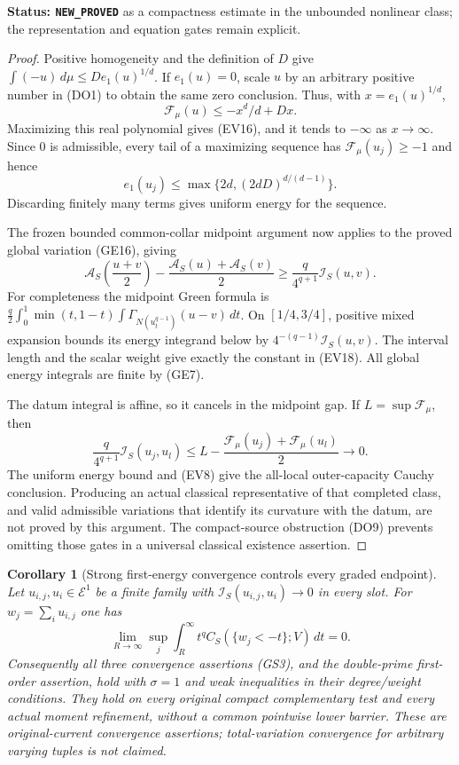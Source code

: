 \documentclass[11pt,a4paper]{article}
\numberwithin{equation}{section}
\newtheorem{corollary}[theorem]{Corollary}
\theoremstyle{definition}
\theoremstyle{remark}
\begin{document}
\noindent\textbf{Status: \texttt{NEW\_PROVED}} as a
compactness estimate in the unbounded nonlinear class;
the representation and equation gates remain explicit.

\begin{proof}
Positive homogeneity and the definition of $D$ give
$\int(-u)\,d\mu\leq D e_1(u)^{1/d}$.
If $e_1(u)=0$, scale $u$ by an arbitrary positive number
in (DO1) to obtain the same zero conclusion.
Thus, with $x=e_1(u)^{1/d}$,
\[
                \mathcal F_\mu(u)\leq-x^d/d+Dx.
\]
Maximizing this real polynomial gives (EV16), and it tends
to $-\infty$ as $x\to\infty$. Since $0$ is admissible,
every tail of a maximizing sequence has
$\mathcal F_\mu(u_j)\geq-1$ and hence
\[
          e_1(u_j)\leq
             \max\{2d,(2dD)^{d/(d-1)}\}.
 \tag{EV17}
\]
Discarding finitely many terms gives uniform energy for
the sequence.

The frozen bounded common-collar midpoint argument now
applies to the proved global variation (GE16), giving
\[
 \mathscr A_S\left(\frac{u+v}2\right)
       -\frac{\mathscr A_S(u)+\mathscr A_S(v)}2
            \geq\frac q{4^{q+1}}\mathscr I_S(u,v).
 \tag{EV18}
\]
For completeness the midpoint Green formula is
$\frac q2\int_0^1\min(t,1-t)
 \int\Gamma_{N(u_t^{q-1})}(u-v)\,dt$.
On $[1/4,3/4]$, positive mixed expansion bounds its
energy integrand below by $4^{-(q-1)}\mathscr I_S(u,v)$.
The interval length and the scalar weight give exactly
the constant in (EV18). All global energy integrals
are finite by (GE7).

The datum integral is affine, so it cancels in the midpoint
gap. If $L=\sup\mathcal F_\mu$, then
\[
 \frac q{4^{q+1}}\mathscr I_S(u_j,u_l)
        \leq L-\frac{\mathcal F_\mu(u_j)+
                              \mathcal F_\mu(u_l)}2\longrightarrow0.
\]
The uniform energy bound and (EV8) give the all-local
outer-capacity Cauchy conclusion. Producing an actual
classical representative of that completed class, and
valid admissible variations that identify its curvature
with the datum, are not proved by this argument. The
compact-source obstruction (DO9) prevents omitting those
gates in a universal classical existence assertion.
\end{proof}

\begin{corollary}[Strong first-energy convergence controls every graded endpoint]
\label{cor:r11-strong-first-energy-graded-endpoints}
Let $u_{i,j},u_i\in\mathcal E^1$ be a finite family with
$\mathscr I_S(u_{i,j},u_i)\to0$ in every slot. For
$w_j=\sum_i u_{i,j}$ one has
\[
 \lim_{R\to\infty}\sup_j\int_R^\infty
                 t^q C_S(\{w_j<-t\};V)\,dt=0.
 \tag{EV19}
\]
Consequently all three convergence assertions (GS3), and
the double-prime first-order assertion, hold with
$\sigma=1$ and weak inequalities in their degree/weight
conditions. They hold on every original compact
complementary test and every actual moment refinement,
without a common pointwise lower barrier. These are
original-current convergence assertions; total-variation
convergence for arbitrary varying tuples is not claimed.
\end{corollary}
\end{document}
